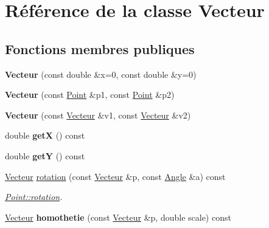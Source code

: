 \hypertarget{class_vecteur}{\section{Référence de la classe Vecteur}
\label{class_vecteur}
}
\subsection*{Fonctions membres publiques}
\begin{DoxyCompactItemize}
\item 
\hypertarget{class_vecteur_a46d3489a12a0233448648651532607ff}{{\bfseries Vecteur} (const double \&x=0, const double \&y=0)}\label{class_vecteur_a46d3489a12a0233448648651532607ff}

\item 
\hypertarget{class_vecteur_a95e860a6f134384a5ae870c1960e54b6}{{\bfseries Vecteur} (const \hyperlink{class_point}{Point} \&p1, const \hyperlink{class_point}{Point} \&p2)}\label{class_vecteur_a95e860a6f134384a5ae870c1960e54b6}

\item 
\hypertarget{class_vecteur_a5b328da1ba17bca82048359d59c0abc3}{{\bfseries Vecteur} (const \hyperlink{class_vecteur}{Vecteur} \&v1, const \hyperlink{class_vecteur}{Vecteur} \&v2)}\label{class_vecteur_a5b328da1ba17bca82048359d59c0abc3}

\item 
\hypertarget{class_vecteur_a42f7a7f1dc44e088c278d3b3363c5a33}{double {\bfseries get\+X} () const }\label{class_vecteur_a42f7a7f1dc44e088c278d3b3363c5a33}

\item 
\hypertarget{class_vecteur_a323d689fb951261b557ea65b10af3893}{double {\bfseries get\+Y} () const }\label{class_vecteur_a323d689fb951261b557ea65b10af3893}

\item 
\hyperlink{class_vecteur}{Vecteur} \hyperlink{class_vecteur_a9d61176ddcefcc1dcf0ae2d5fd2e9ee7}{rotation} (const \hyperlink{class_vecteur}{Vecteur} \&p, const \hyperlink{class_angle}{Angle} \&a) const 
\begin{DoxyCompactList}\small\item\em \hyperlink{class_point_a32bc5c9d0e07f0e4b54187ffcd3c8a67}{Point\+::rotation}. \end{DoxyCompactList}\item 
\hypertarget{class_vecteur_ab012afb15826a7d5858a3b45ea763a57}{\hyperlink{class_vecteur}{Vecteur} {\bfseries homothetie} (const \hyperlink{class_vecteur}{Vecteur} \&p, double scale) const }\label{class_vecteur_ab012afb15826a7d5858a3b45ea763a57}


\end{DoxyCompactItemize}
